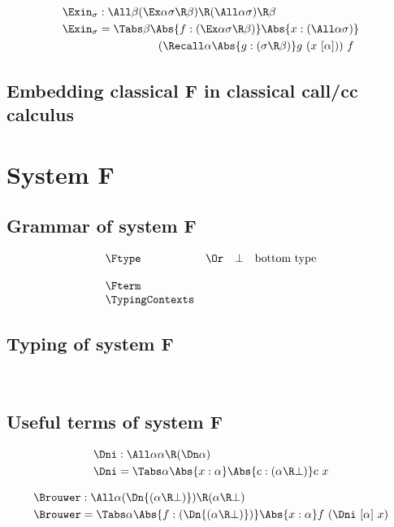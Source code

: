 \documentclass{amsart}
\begin{document}
\begin{align*}
\Exin_\sigma & : \All\beta
  (\Ex\alpha \sigma \R \beta) \R
  (\All\alpha\sigma) \R \beta
  \\
\Exin_\sigma & = \Tabs\beta
  \Abs{f : (\Ex\alpha \sigma \R \beta)}
  \Abs{x : (\All\alpha \sigma)}
  \\ &\hspace{5.3em}
  (\Recall\alpha
  \Abs{g : (\sigma \R \beta)}
  g~(x~[\alpha]))~f
\end{align*}

\subsection{Embedding classical F in classical call/cc calculus}

\section{System F}

\subsection{Grammar of system F}

\[
\begin{array}{lclr}
\Ftype
&\Or& \bot & \mbox{bottom type} \\
\\
\Fterm
\\
\TypingContexts
\end{array}
\]

\subsection{Typing of system F}
~

\FRules

\subsection{Useful terms of system F}
\label{sec:f-terms}

\begin{align*}
\Dni & : \All\alpha \alpha \R (\Dn\alpha) \\
\Dni & = \Tabs\alpha \Abs{x:\alpha}
           \Abs{c : (\alpha \R \bot)} c~x
\end{align*}

\begin{align*}
\Brouwer & : \All\alpha (\Dn{(\alpha\R\bot)}) \R (\alpha \R \bot) \\
\Brouwer & = \Tabs\alpha \Abs{f:(\Dn{(\alpha\R\bot)})}
           \Abs{x:\alpha} f~(\Dni~[\alpha]~x)
\end{align*}
\end{document}
